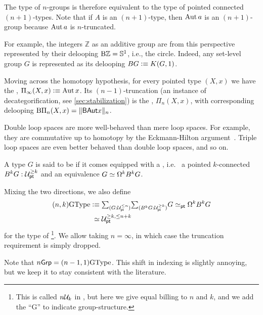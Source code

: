 The type of $n$-groups is therefore equivalent to the type of pointed connected $(n+1)$-types. Note that if $A$ is an $(n+1)$-type, then $\Aut a$ is an $(n+1)$-group because $\Aut a$ is $n$-truncated.

For example, the integers $\mathbb{Z}$ as an additive group are from this
perspective represented by their delooping $\mathop{\mathrm{B}\mathbb{Z}}=\bS^1$, i.e., the circle.
Indeed, any set-level group $G$ is represented as its delooping $BG\defeq K(G,1)$.

Moving across the homotopy hypothesis, for every pointed type $(X,x)$
we have the ,
$\Pi_\infty(X,x)\defeq \Aut x$. Its $(n-1)$-truncation (an instance of
decategorification, see \cref{sec:stabilization}) is the
, $\Pi_n(X,x)$,
with corresponding delooping $\mathrm{B}\Pi_n(X,x) = \trunc{n}{\BAut x}$.

Double loop spaces are more well-behaved than mere loop
spaces. For example, they are commutative up to homotopy
by the Eckmann-Hilton argument~\cite[Theorem~2.1.6]{hottbook}.
Triple loop spaces are even better behaved than double loop spaces, and so on.

\begin{defn}
A type $G$ is said to be  if it comes equipped with a , i.e.~ a pointed $k$-connected
$B^kG : \UU_\pt^{\ge k}$ and an equivalence $G \eqvsym \loopspacesym^kB^kG$.

Mixing the two directions, we also define
\begin{align*}
  (n,k)\GType
  &\defeq  \sm{G : \UU_\pt^{\le n}}{B^kG : \UU_\pt^{\ge k}}
    G \eqvsym_\pt \loopspacesym^kB^kG \\
  & \phantom{:}\eqvsym \UU_\pt^{\ge k,\le n+k}
\end{align*}
for the type of \footnote{This
  is called $n\UU_k$ in \cite{BaezDolan1998}, but here we give equal
  billing to $n$ and $k$,
  and we add the ``G'' to indicate group-structure.}.
We allow taking $n=\infty$, in which case the truncation requirement
is simply dropped.
\end{defn}

Note that $n\mathsf{Grp} = (n-1,1)\GType$. This shift in indexing is slightly
annoying, but we keep it to stay consistent with the literature.

